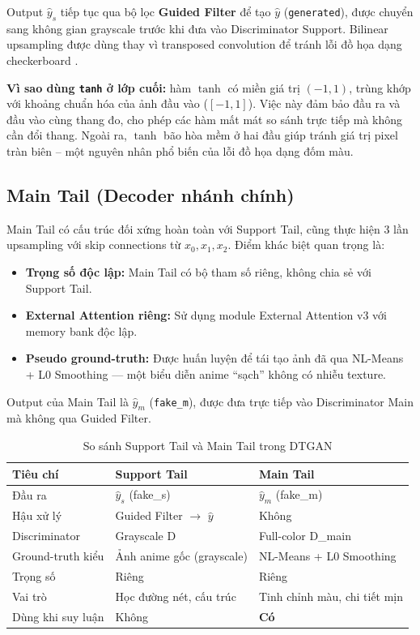 Output $\widehat{y}_s$ tiếp tục qua bộ lọc \textbf{Guided Filter} để tạo $\widehat{y}$ (\texttt{generated}), được chuyển sang không gian grayscale trước khi đưa vào Discriminator Support. Bilinear upsampling được dùng thay vì transposed convolution để tránh lỗi đồ họa dạng checkerboard \cite{Hasan2019}.

\textbf{Vì sao dùng \texttt{tanh} ở lớp cuối:} hàm $\tanh$ có miền giá trị $(-1, 1)$, trùng khớp với khoảng chuẩn hóa của ảnh đầu vào ($[-1,1]$). Việc này đảm bảo đầu ra và đầu vào cùng thang đo, cho phép các hàm mất mát so sánh trực tiếp mà không cần đổi thang. Ngoài ra, $\tanh$ bão hòa mềm ở hai đầu giúp tránh giá trị pixel tràn biên -- một nguyên nhân phổ biến của lỗi đồ họa dạng đốm màu.

\subsection{Main Tail (Decoder nhánh chính)}
\label{subsec:main_tail}

Main Tail có cấu trúc đối xứng hoàn toàn với Support Tail, cũng thực hiện 3 lần upsampling với skip connections từ $x_0, x_1, x_2$. Điểm khác biệt quan trọng là:

\begin{itemize}
    \item \textbf{Trọng số độc lập:} Main Tail có bộ tham số riêng, không chia sẻ với Support Tail.
    \item \textbf{External Attention riêng:} Sử dụng module External Attention v3 với memory bank độc lập.
    \item \textbf{Pseudo ground-truth:} Được huấn luyện để tái tạo ảnh đã qua NL-Means + L0 Smoothing --- một biểu diễn anime ``sạch'' không có nhiễu texture.
\end{itemize}

Output của Main Tail là $\widehat{y}_m$ (\texttt{fake\_m}), được đưa trực tiếp vào Discriminator Main mà không qua Guided Filter.

\begin{table}[H]
\caption{So sánh Support Tail và Main Tail trong DTGAN}
\label{tab:tail_comparison}
\centering
\begin{tabular}{|p{3.5cm}|p{5cm}|p{5cm}|}
\hline
\textbf{Tiêu chí} & \textbf{Support Tail} & \textbf{Main Tail} \\
\hline
Đầu ra & $\widehat{y}_s$ (fake\_s) & $\widehat{y}_m$ (fake\_m) \\
\hline
Hậu xử lý & Guided Filter $\to$ $\widehat{y}$ & Không \\
\hline
Discriminator & Grayscale D & Full-color D\_main \\
\hline
Ground-truth kiểu & Ảnh anime gốc (grayscale) & NL-Means + L0 Smoothing \\
\hline
Trọng số & Riêng & Riêng \\
\hline
Vai trò & Học đường nét, cấu trúc & Tinh chỉnh màu, chi tiết mịn \\
\hline
Dùng khi suy luận & Không & \textbf{Có} \\
\hline
\end{tabular}
\end{table}

